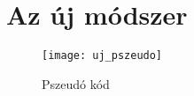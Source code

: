 \chapter{Az új módszer}
\begin{figure}[H]
\begin{center}
\texttt{[image: uj\_pszeudo]}
\caption{Pszeudó kód}
\label{uj_pszeudo}
\end{center}
\end{figure}